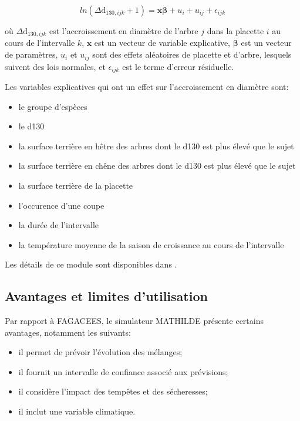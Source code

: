 \documentclass[a4paper,12pt]{article}
\def\vect#1{\bm{#1}}
\begin{document}
\begin{equation}
ln(\Delta \text{d}_{130,ijk} + 1)  = \vect{x} \vect{\beta} + u_i + u_{ij} + \epsilon_{ijk}
\end{equation}

où $\Delta \text{d}_{130,ijk}$ est l'accroissement en diamètre de l'arbre $j$ dans la placette $i$ au cours de l'intervalle $k$, $\vect{x}$ est un vecteur de variable explicative, $\vect{\beta}$ est un vecteur de paramètres, $u_i$ et $u_{ij}$ sont des effets aléatoires de placette et d'arbre, lesquels suivent des lois normales, et $\epsilon_{ijk}$ est le terme d'erreur résiduelle.

Les variables explicatives qui ont un effet sur l'accroissement en diamètre sont:

\begin{itemize}
  \item le groupe d'espèces
  \item le d130
  \item la surface terrière en hêtre des arbres dont le d130 est plus élevé que le sujet
  \item la surface terrière en chêne des arbres dont le d130 est plus élevé que le sujet
  \item la surface terrière de la placette
  \item l'occurence d'une coupe
  \item la durée de l'intervalle
  \item la température moyenne de la saison de croissance au cours de l'intervalle
\end{itemize}

Les détails de ce module sont disponibles dans \citet{manso_accr_2015}. 

\subsection{Avantages et limites d'utilisation}

Par rapport à FAGACEES, le simulateur MATHILDE présente certains avantages, notamment les suivants:

\begin{itemize}
  \item il permet de prévoir l'évolution des mélanges;
  \item il fournit un intervalle de confiance associé aux prévisions;
  \item il considère l'impact des tempêtes et des sécheresses; 
  \item il inclut une variable climatique.
\end{itemize}
\end{document}
